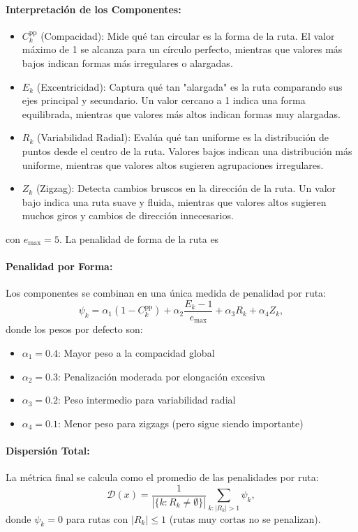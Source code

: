 \documentclass[11pt, a4paper]{article}
\begin{document}
\paragraph{Interpretación de los Componentes:}
\begin{itemize}
\item $C^{\text{pp}}_k$ (Compacidad): Mide qué tan circular es la forma de la ruta. El valor máximo de 1 se alcanza para un círculo perfecto, mientras que valores más bajos indican formas más irregulares o alargadas.

\item $E_k$ (Excentricidad): Captura qué tan "alargada" es la ruta comparando sus ejes principal y secundario. Un valor cercano a 1 indica una forma equilibrada, mientras que valores más altos indican formas muy alargadas.

\item $R_k$ (Variabilidad Radial): Evalúa qué tan uniforme es la distribución de puntos desde el centro de la ruta. Valores bajos indican una distribución más uniforme, mientras que valores altos sugieren agrupaciones irregulares.

\item $Z_k$ (Zigzag): Detecta cambios bruscos en la dirección de la ruta. Un valor bajo indica una ruta suave y fluida, mientras que valores altos sugieren muchos giros y cambios de dirección innecesarios.
\end{itemize}
con $e_{\max}=5$. La penalidad de forma de la ruta es
\paragraph{Penalidad por Forma:} Los componentes se combinan en una única medida de penalidad por ruta:
\[
\psi_k = \alpha_1(1-C^{\text{pp}}_k) + \alpha_2\frac{E_k-1}{e_{\max}} + \alpha_3 R_k + \alpha_4 Z_k,
\]
donde los pesos por defecto son:
\begin{itemize}
\item $\alpha_1 = 0.4$: Mayor peso a la compacidad global
\item $\alpha_2 = 0.3$: Penalización moderada por elongación excesiva
\item $\alpha_3 = 0.2$: Peso intermedio para variabilidad radial
\item $\alpha_4 = 0.1$: Menor peso para zigzags (pero sigue siendo importante)
\end{itemize}

\paragraph{Dispersión Total:} La métrica final se calcula como el promedio de las penalidades por ruta:
\[
\mathcal{D}(x) = \frac{1}{|\{k:R_k\neq\emptyset\}|}\sum_{k:|R_k|>1} \psi_k,
\]
donde $\psi_k=0$ para rutas con $|R_k|\le 1$ (rutas muy cortas no se penalizan).
\end{document}
